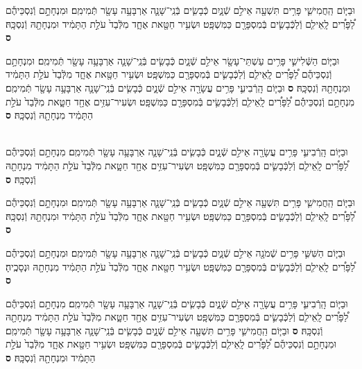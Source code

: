 \documentclass[twoside, openany, parskip=half, 11pt]{book}
\begin{document}
\begin{footnotesize}
\begin{multicols}{2}
וּבַיּ֧וֹם הַֽחֲמִישִׁ֛י פָּרִ֥ים תִּשְׁעָ֖ה אֵילִ֣ם שְֿׁנָ֑יִם כְּֿבָשִׂ֧ים בְּֿנֵֽי־שָׁנָ֛ה אַרְבָּעָ֥ה עָשָׂ֖ר תְּֿמִימִֽם׃ וּמִנְחָתָ֣ם וְֿנִסְכֵּיהֶ֡ם לַ֠פָּרִ֠ים לָֽאֵילִ֧ם וְֿלַכְּֿבָשִׂ֛ים בְּֿמִסְפָּרָ֖ם כַּמִּשְׁפָּֽט׃ וּשְׂעִ֥יר חַטָּ֖את אֶחָ֑ד מִלְּֿבַד֙ עֹלַ֣ת הַתָּמִ֔יד וּמִנְחָתָ֖הּ וְֿנִסְכָּֽהּ׃ \textbf{ס}

וּבַיּ֧וֹם הַשְּֿׁלִישִׁ֛י פָּרִ֥ים עַשְׁתֵּי־עָשָׂ֖ר אֵילִ֣ם שְֿׁנָ֑יִם כְּֿבָשִׂ֧ים בְּֿנֵֽי־שָׁנָ֛ה אַרְבָּעָ֥ה עָשָׂ֖ר תְּֿמִימִֽם׃ וּמִנְחָתָ֣ם וְֿנִסְכֵּיהֶ֡ם לַ֠פָּרִ֠ים לָֽאֵילִ֧ם וְֿלַכְּֿבָשִׂ֛ים בְּֿמִסְפָּרָ֖ם כַּמִּשְׁפָּֽט׃ וּשְׂעִ֥יר חַטָּ֖את אֶחָ֑ד מִלְּֿבַד֙ עֹלַ֣ת הַתָּמִ֔יד וּמִנְחָתָ֖הּ וְֿנִסְכָּֽהּ׃ \textbf{ס}
וּבַיּ֧וֹם הָֽרְֿבִיעִ֛י פָּרִ֥ים עֲשָׂרָ֖ה אֵילִ֣ם שְֿׁנָ֑יִם כְּֿבָשִׂ֧ים בְּֿנֵֽי־שָׁנָ֛ה אַרְבָּעָ֥ה עָשָׂ֖ר תְּֿמִימִֽם׃ מִנְחָתָ֣ם וְֿנִסְכֵּיהֶ֡ם לַ֠פָּרִ֠ים לָֽאֵילִ֧ם וְֿלַכְּֿבָשִׂ֛ים בְּֿמִסְפָּרָ֖ם כַּמִּשְׁפָּֽט׃ וּשְׂעִיר־עִזִּ֥ים אֶחָ֖ד חַטָּ֑את מִלְּֿבַד֙ עֹלַ֣ת הַתָּמִ֔יד מִנְחָתָ֖הּ וְֿנִסְכָּֽהּ׃ \textbf{ס}

\\
וּבַיּ֧וֹם הָֽרְֿבִיעִ֛י פָּרִ֥ים עֲשָׂרָ֖ה אֵילִ֣ם שְֿׁנָ֑יִם כְּֿבָשִׂ֧ים בְּֿנֵֽי־שָׁנָ֛ה אַרְבָּעָ֥ה עָשָׂ֖ר תְּֿמִימִֽם׃ מִנְחָתָ֣ם וְֿנִסְכֵּיהֶ֡ם לַ֠פָּרִ֠ים לָֽאֵילִ֧ם וְֿלַכְּֿבָשִׂ֛ים בְּֿמִסְפָּרָ֖ם כַּמִּשְׁפָּֽט׃ וּשְׂעִיר־עִזִּ֥ים אֶחָ֖ד חַטָּ֑את מִלְּֿבַד֙ עֹלַ֣ת הַתָּמִ֔יד מִנְחָתָ֖הּ וְֿנִסְכָּֽהּ׃ \textbf{ס}

וּבַיּ֧וֹם הַֽחֲמִישִׁ֛י פָּרִ֥ים תִּשְׁעָ֖ה אֵילִ֣ם שְֿׁנָ֑יִם כְּֿבָשִׂ֧ים בְּֿנֵֽי־שָׁנָ֛ה אַרְבָּעָ֥ה עָשָׂ֖ר תְּֿמִימִֽם׃ וּמִנְחָתָ֣ם וְֿנִסְכֵּיהֶ֡ם לַ֠פָּרִ֠ים לָֽאֵילִ֧ם וְֿלַכְּֿבָשִׂ֛ים בְּֿמִסְפָּרָ֖ם כַּמִּשְׁפָּֽט׃ וּשְׂעִ֥יר חַטָּ֖את אֶחָ֑ד מִלְּֿבַד֙ עֹלַ֣ת הַתָּמִ֔יד וּמִנְחָתָ֖הּ וְֿנִסְכָּֽהּ׃ \textbf{ס}

וּבַיּ֧וֹם הַשִּׁשִּׁ֛י פָּרִ֥ים שְֿׁמֹנָ֖ה אֵילִ֣ם שְֿׁנָ֑יִם כְּֿבָשִׂ֧ים בְּֿנֵֽי־שָׁנָ֛ה אַרְבָּעָ֥ה עָשָׂ֖ר תְּֿמִימִֽם׃ וּמִנְחָתָ֣ם וְֿנִסְכֵּיהֶ֡ם לַ֠פָּרִ֠ים לָֽאֵילִ֧ם וְֿלַכְּֿבָשִׂ֛ים בְּֿמִסְפָּרָ֖ם כַּמִּשְׁפָּֽט׃ וּשְׂעִ֥יר חַטָּ֖את אֶחָ֑ד מִלְּֿבַד֙ עֹלַ֣ת הַתָּמִ֔יד מִנְחָתָ֖הּ וּנְסָכֶֽיהָ׃ \textbf{ס}

וּבַיּ֧וֹם הָֽרְֿבִיעִ֛י פָּרִ֥ים עֲשָׂרָ֖ה אֵילִ֣ם שְֿׁנָ֑יִם כְּֿבָשִׂ֧ים בְּֿנֵֽי־שָׁנָ֛ה אַרְבָּעָ֥ה עָשָׂ֖ר תְּֿמִימִֽם׃ מִנְחָתָ֣ם וְֿנִסְכֵּיהֶ֡ם לַ֠פָּרִ֠ים לָֽאֵילִ֧ם וְֿלַכְּֿבָשִׂ֛ים בְּֿמִסְפָּרָ֖ם כַּמִּשְׁפָּֽט׃ וּשְׂעִיר־עִזִּ֥ים אֶחָ֖ד חַטָּ֑את מִלְּֿבַד֙ עֹלַ֣ת הַתָּמִ֔יד מִנְחָתָ֖הּ וְֿנִסְכָּֽהּ׃ \textbf{ס}
וּבַיּ֧וֹם הַֽחֲמִישִׁ֛י פָּרִ֥ים תִּשְׁעָ֖ה אֵילִ֣ם שְֿׁנָ֑יִם כְּֿבָשִׂ֧ים בְּֿנֵֽי־שָׁנָ֛ה אַרְבָּעָ֥ה עָשָׂ֖ר תְּֿמִימִֽם׃ וּמִנְחָתָ֣ם וְֿנִסְכֵּיהֶ֡ם לַ֠פָּרִ֠ים לָֽאֵילִ֧ם וְֿלַכְּֿבָשִׂ֛ים בְּֿמִסְפָּרָ֖ם כַּמִּשְׁפָּֽט׃ וּשְׂעִ֥יר חַטָּ֖את אֶחָ֑ד מִלְּֿבַד֙ עֹלַ֣ת הַתָּמִ֔יד וּמִנְחָתָ֖הּ וְֿנִסְכָּֽהּ׃ \textbf{ס}


\end{multicols}
\end{footnotesize}
\end{document}
